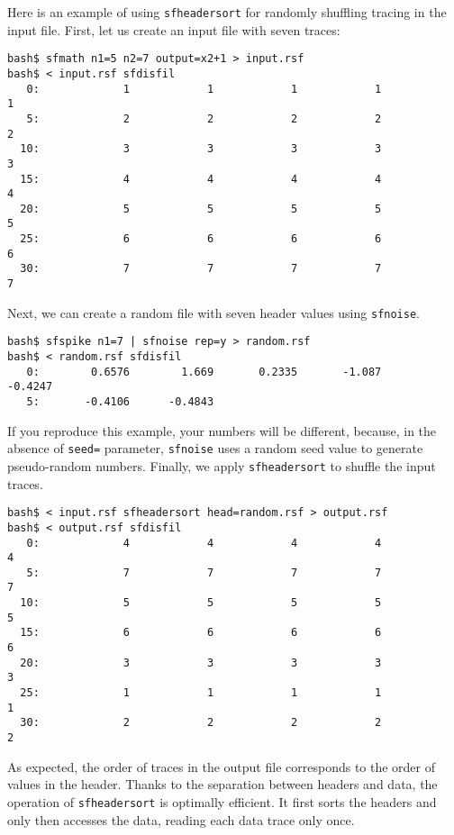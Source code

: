 Here is an example of using
\texttt{sfheadersort} for randomly shuffling tracing in the input
file. First, let us create an input file with seven traces:
\begin{verbatim}
bash$ sfmath n1=5 n2=7 output=x2+1 > input.rsf
bash$ < input.rsf sfdisfil
   0:             1            1            1            1            1
   5:             2            2            2            2            2
  10:             3            3            3            3            3
  15:             4            4            4            4            4
  20:             5            5            5            5            5
  25:             6            6            6            6            6
  30:             7            7            7            7            7 
\end{verbatim}
Next, we can create a random file with seven header values using
\texttt{sfnoise}.
\begin{verbatim}
bash$ sfspike n1=7 | sfnoise rep=y > random.rsf
bash$ < random.rsf sfdisfil
   0:        0.6576        1.669       0.2335       -1.087      -0.4247
   5:       -0.4106      -0.4843
\end{verbatim}
If you reproduce this example, your numbers will be different,
because, in the absence of \texttt{seed=} parameter, \texttt{sfnoise}
uses a random seed value to generate pseudo-random numbers. Finally, we
apply \texttt{sfheadersort} to shuffle the input traces.
\begin{verbatim}
bash$ < input.rsf sfheadersort head=random.rsf > output.rsf
bash$ < output.rsf sfdisfil
   0:             4            4            4            4            4
   5:             7            7            7            7            7
  10:             5            5            5            5            5
  15:             6            6            6            6            6
  20:             3            3            3            3            3
  25:             1            1            1            1            1
  30:             2            2            2            2            2
\end{verbatim}
As expected, the order of traces in the output file corresponds to the
order of values in the header. Thanks to the separation between
headers and data, the operation of \texttt{sfheadersort} is optimally
efficient. It first sorts the headers and only then accesses the data,
reading each data trace only once.

